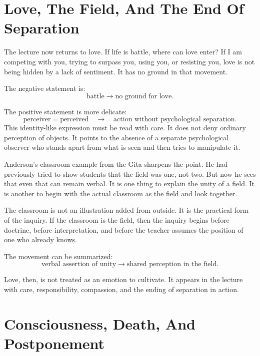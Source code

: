 \section{Love, The Field, And The End Of Separation}

The lecture now returns to love. If life is battle, where can love enter? If I am competing with you, trying to surpass you, using you, or resisting you, love is not being hidden by a lack of sentiment. It has no ground in that movement.

The negative statement is:
\begin{equation}
\text{battle}
   \longrightarrow
\text{no ground for love}.
\end{equation}

The positive statement is more delicate:
\begin{equation}
\text{perceiver} = \text{perceived}
   \quad \longrightarrow \quad
\text{action without psychological separation}.
\end{equation}
This identity-like expression must be read with care. It does not deny ordinary perception of objects. It points to the absence of a separate psychological observer who stands apart from what is seen and then tries to manipulate it.

Anderson's classroom example from the Gita sharpens the point. He had previously tried to show students that the field was one, not two. But now he sees that even that can remain verbal. It is one thing to explain the unity of a field. It is another to begin with the actual classroom as the field and look together.

\begin{remark}
The classroom is not an illustration added from outside. It is the practical form of the inquiry. If the classroom is the field, then the inquiry begins before doctrine, before interpretation, and before the teacher assumes the position of one who already knows.
\end{remark}

The movement can be summarized:
\begin{equation}
\text{verbal assertion of unity}
   \longrightarrow
\text{shared perception in the field}.
\end{equation}

Love, then, is not treated as an emotion to cultivate. It appears in the lecture with care, responsibility, compassion, and the ending of separation in action.

\section{Consciousness, Death, And Postponement}

